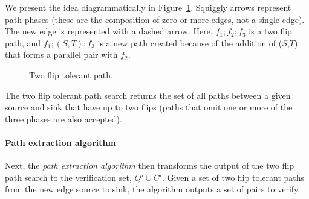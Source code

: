 \documentclass[sigplan,review]{acmart}
\begin{document}
We present the idea diagrammatically in Figure~\ref{figure_two_flip}.
Squiggly arrows represent path phases (these are the composition of zero or more edges, not a single edge).
The new edge is represented with a dashed arrow.
Here, $f_1 ; f_2 ; f_3$ is a two flip path, and $f_1 ; (S, T) ; f_3$ is a new path created because of the addition of ($S$,$T$) that forms a parallel pair with $f_2$.

\begin{figure}
\begin{center}
\end{center}
\caption{Two flip tolerant path.}
\label{figure_two_flip}
\end{figure}

The two flip tolerant path search returns the set of all paths between a given source and sink that have up to two flips (paths that omit one or more of the three phases are also accepted).

\paragraph{Path extraction algorithm}
Next, the \textit{path extraction algorithm} then transforms the output of the two flip path search to the verification set, $Q' \cup C'$.
Given a set of two flip tolerant paths from the new edge source to sink, the algorithm outputs a set of pairs to verify.
\end{document}
